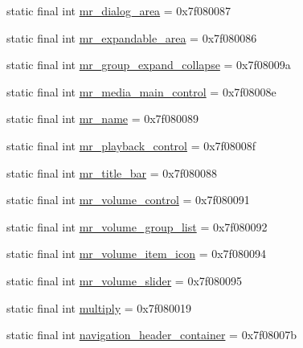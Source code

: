 \begin{CompactItemize}
\item 
static final int \hyperlink{classandroid_1_1support_1_1transition_1_1_r_1_1id_4e5d2bfb10e4e85c429e69b92b5b3d19}{mr\_\-dialog\_\-area} = 0x7f080087
\item 
static final int \hyperlink{classandroid_1_1support_1_1transition_1_1_r_1_1id_60508be029fdc3005b5ddfa5a7b76167}{mr\_\-expandable\_\-area} = 0x7f080086
\item 
static final int \hyperlink{classandroid_1_1support_1_1transition_1_1_r_1_1id_dcd2083ad260ff1fa6909f9563dd8ce3}{mr\_\-group\_\-expand\_\-collapse} = 0x7f08009a
\item 
static final int \hyperlink{classandroid_1_1support_1_1transition_1_1_r_1_1id_4709e3bffc270c16539e121896fae193}{mr\_\-media\_\-main\_\-control} = 0x7f08008e
\item 
static final int \hyperlink{classandroid_1_1support_1_1transition_1_1_r_1_1id_4dcf6cc60a7a5fb2b572e8a45f841e78}{mr\_\-name} = 0x7f080089
\item 
static final int \hyperlink{classandroid_1_1support_1_1transition_1_1_r_1_1id_999bc57c022ae09558b05add521de8fb}{mr\_\-playback\_\-control} = 0x7f08008f
\item 
static final int \hyperlink{classandroid_1_1support_1_1transition_1_1_r_1_1id_33940d08951e31aea3c4f6ccecfb8f30}{mr\_\-title\_\-bar} = 0x7f080088
\item 
static final int \hyperlink{classandroid_1_1support_1_1transition_1_1_r_1_1id_3c2f3f9c1ba179fa41fc6b0e98902042}{mr\_\-volume\_\-control} = 0x7f080091
\item 
static final int \hyperlink{classandroid_1_1support_1_1transition_1_1_r_1_1id_9c1786c8df1e54606cd3941dc7a68df1}{mr\_\-volume\_\-group\_\-list} = 0x7f080092
\item 
static final int \hyperlink{classandroid_1_1support_1_1transition_1_1_r_1_1id_2108bbbc1466374ba892842f56c5621d}{mr\_\-volume\_\-item\_\-icon} = 0x7f080094
\item 
static final int \hyperlink{classandroid_1_1support_1_1transition_1_1_r_1_1id_045bc86ed367d09cae4b25f4986e078a}{mr\_\-volume\_\-slider} = 0x7f080095
\item 
static final int \hyperlink{classandroid_1_1support_1_1transition_1_1_r_1_1id_9374a6af4e65ff76866eb1e68e8cfde3}{multiply} = 0x7f080019
\item 
static final int \hyperlink{classandroid_1_1support_1_1transition_1_1_r_1_1id_be5cf35986c202cfc338a3b8560d0365}{navigation\_\-header\_\-container} = 0x7f08007b
\item 

\end{CompactItemize}
